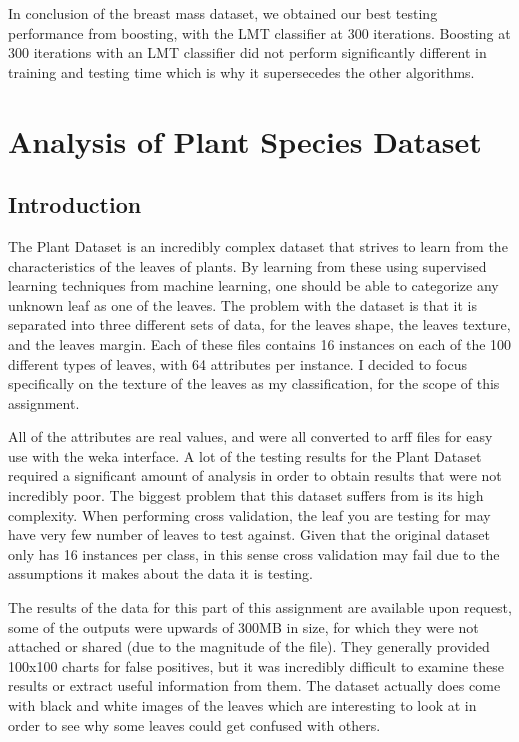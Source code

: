 \documentclass[annual]{acmsiggraph}
\begin{document}
In conclusion of the breast mass dataset, we obtained our best testing performance from boosting, with the LMT classifier at 300
iterations. Boosting at 300 iterations with an LMT classifier did not perform significantly different in training and testing time
which is why it supersecedes the other algorithms. 

\section{Analysis of Plant Species Dataset}

\subsection{Introduction}

The Plant Dataset is an incredibly complex dataset that strives to learn from
the characteristics of the leaves of plants. By learning from these using
supervised learning techniques from machine learning, one should be able to
categorize any unknown leaf as one of the leaves. The problem with the dataset
is that it is separated into three different sets of data, for the leaves shape,
the leaves texture, and the leaves margin. Each of these files contains 16
instances on each of the 100 different types of leaves, with 64 attributes per
instance. I decided to focus specifically on the texture of the leaves as my
classification, for the scope of this assignment.

All of the attributes are real values, and were all converted to arff files
for easy use with the weka interface. A lot of the testing results for the
Plant Dataset required a significant amount of analysis in order to obtain
results that were not incredibly poor. The biggest problem that this dataset
suffers from is its high complexity. When performing cross validation, the leaf
you are testing for may have very few number of leaves to test against. Given
that the original dataset only has 16 instances per class, in this sense cross
validation may fail due to the assumptions it makes about the data it is testing.

The results of the data for this part of this assignment are available upon request,
some of the outputs were upwards of 300MB in size, for which they were not attached
or shared (due to the magnitude of the file). They generally provided 100x100 charts
for false positives, but it was incredibly difficult to examine these results or
extract useful information from them. The dataset actually does come with black
and white images of the leaves which are interesting to look at in order to see
why some leaves could get confused with others.
\end{document}
